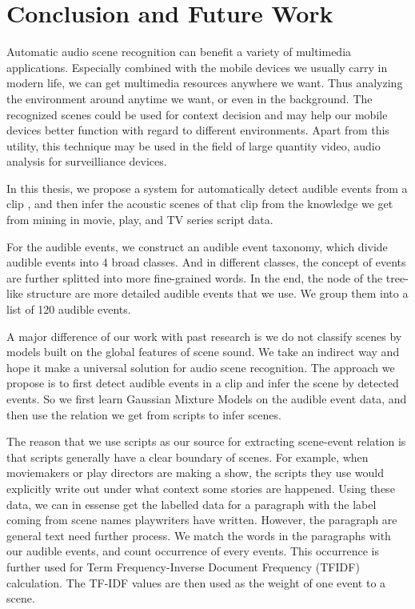 
\chapter{Conclusion and Future Work}
Automatic audio scene recognition can benefit a variety of multimedia applications. 
Especially combined with the mobile devices we usually carry in modern life, we can get multimedia resources anywhere we want. 
Thus analyzing the environment around anytime we want, or even in the background. 
The recognized scenes could be used for context decision and may help our mobile devices better function with regard to different environments. 
Apart from this utility, this technique may be used in the field of large quantity video, audio analysis for surveilliance devices. 

In this thesis, we propose a system for automatically detect audible events from a clip ,
and then infer the acoustic scenes of that clip from the knowledge we get from mining in movie, play, and TV series script data. 

For the audible events, we construct an audible event taxonomy, which divide audible events into 4 broad classes. 
And in different classes, the concept of events are further splitted into more fine-grained words. 
In the end, the node of the tree-like structure are more detailed audible events that we use. 
We group them into a list of 120 audible events. 

A major difference of our work with past research is we do not classify scenes by models built on the global features of scene sound. 
We take an indirect way and hope it make a universal solution for audio scene recognition. 
The approach we propose is to first detect audible events in a clip and infer the scene by detected events. 
So we first learn Gaussian Mixture Models on the audible event data, and then use the relation we get from scripts to infer scenes. 

The reason that we use scripts as our source for extracting scene-event relation is that scripts generally have a clear boundary of scenes. 
For example, when moviemakers or play directors are making a show, the scripts they use would explicitly write out under what context some stories are happened. 
Using these data, we can in essense get the labelled data for a paragraph with the label coming from scene names playwriters have written. 
However, the paragraph are general text need further process. 
We match the words in the paragraphs with our audible events, and count occurrence of every events. 
This occurrence is further used for Term Frequency-Inverse Document Frequency (TFIDF) calculation. 
The TF-IDF values are then used as the weight of one event to a scene. 

